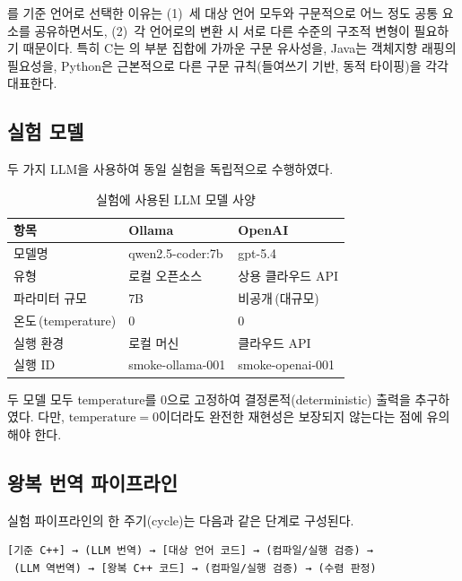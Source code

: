 \cpp{}를 기준 언어로 선택한 이유는 (1)~세 대상 언어 모두와 구문적으로 어느 정도 공통 요소를 공유하면서도, (2)~각 언어로의 변환 시 서로 다른 수준의 구조적 변형이 필요하기 때문이다. 특히 C는 \cpp{}의 부분 집합에 가까운 구문 유사성을, Java는 객체지향 래핑의 필요성을, Python은 근본적으로 다른 구문 규칙(들여쓰기 기반, 동적 타이핑)을 각각 대표한다.

\subsection{실험 모델}\label{ssec:models}

두 가지 LLM을 사용하여 동일 실험을 독립적으로 수행하였다.

\begin{table}[htbp]
  \centering
  \caption{실험에 사용된 LLM 모델 사양}\label{tab:models}
  \begin{tabular}{@{}lll@{}}
    \toprule
    항목                    & Ollama              & OpenAI            \\
    \midrule
    모델명                  & qwen2.5-coder:7b    & gpt-5.4           \\
    유형                    & 로컬 오픈소스        & 상용 클라우드 API   \\
    파라미터 규모            & 7B                  & 비공개\,(대규모)    \\
    온도\,(temperature)     & 0                   & 0                 \\
    실행 환경               & 로컬 머신            & 클라우드 API       \\
    실행 ID                 & smoke-ollama-001    & smoke-openai-001  \\
    \bottomrule
  \end{tabular}
\end{table}

두 모델 모두 temperature를 $0$으로 고정하여 결정론적(deterministic) 출력을 추구하였다.
다만, $\text{temperature}=0$이더라도 완전한 재현성은 보장되지 않는다는 점에 유의해야 한다.

\subsection{왕복 번역 파이프라인}\label{ssec:pipeline}

실험 파이프라인의 한 주기(cycle)는 다음과 같은 단계로 구성된다.

\begin{lstlisting}[caption={RTT 파이프라인 한 주기},label={lst:pipeline}]
[기준 C++] → (LLM 번역) → [대상 언어 코드] → (컴파일/실행 검증) →
 (LLM 역번역) → [왕복 C++ 코드] → (컴파일/실행 검증) → (수렴 판정)
\end{lstlisting}

